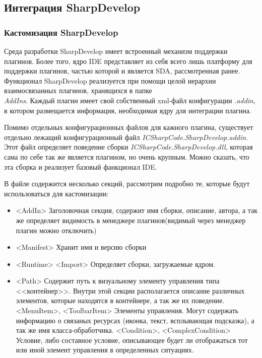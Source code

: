 \subsection{Интеграция SharpDevelop}

\subsubsection{Кастомизация SharpDevelop}
\label{sec:sd_custom}

Среда разработки SharpDevelop имеет встроенный механизм поддержки плагинов. Более того, ядро IDE представляет из себя всего лишь платформу для поддержки плагинов, частью которой и является SDA, рассмотренная ранее. Функционал SharpDevelop реализуется при помощи целой иерархии взаимосвязанных плагинов, хранящихся в папке {\it \\AddIns}. Каждый плагин имеет свой собственный xml-файл конфигурации {\it *.addin}, в котором размещается информация, необходимая ядру для интеграции плагина. 

Помимо отдельных конфигурационных файлов для кажного плагина, существует отдельно лежащий конфигурационный файл {\it ICSharpCode.SharpDevelop.addin}. Этот файл определяет поведение сборки {\it ICSharpCode.SharpDevelop.dll}, которая сама по себе так же является плагином, но очень крупным. Можно сказать, что эта сборка и реализует базовый фанкционал IDE.

В файле содержится несколько секций, рассмотрим подробно те, которые будут использоваться для кастомизации: 

\begin{itemize}
 \item <AddIn> Заголовочная секция, содержит имя сборки, описание, автора, а так же определяет видимость в менеджере плагинов(видимый через менеджер плагин можно отключить)
 \item <Manifest> Хранит имя и версию сборки
 \item <Runtime> <Import> Определяет сборки, загружаемые ядром.
 \item <Path> Содержит путь к визуальному элементу управления типа <<контейнер>>. Внутри этой секции располагается описание различных элементов, которые находятся в контейнере, а так же их поведение.
   \subitem <MenuItem>, <ToolbarItem> Элементы управления. Могут содержать информацию о связаных ресурсах (иконка, текст, всплывающая подсказка), а так же имя класса-обработчика.
   \subitem <Condition>, <ComplexCondition> Условие, либо составное условие, описывающее будет ли отображаться тот или иной элемент управления в определенных ситуациях.
\end{itemize}

